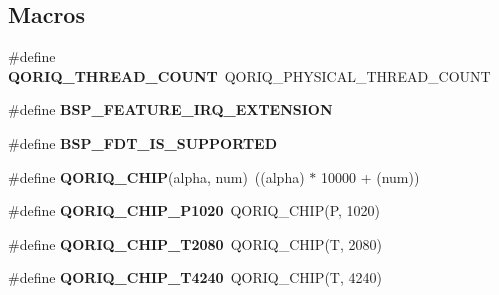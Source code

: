 \subsection*{Macros}
\begin{DoxyCompactItemize}
\item 
\mbox{\label{group__RTEMSBSPsPowerPCQorIQ_gafdba0ab6c3165e18a9eb2e47231a949f}} 
\#define {\bfseries Q\+O\+R\+I\+Q\+\_\+\+T\+H\+R\+E\+A\+D\+\_\+\+C\+O\+U\+NT}~Q\+O\+R\+I\+Q\+\_\+\+P\+H\+Y\+S\+I\+C\+A\+L\+\_\+\+T\+H\+R\+E\+A\+D\+\_\+\+C\+O\+U\+NT
\item 
\mbox{\label{group__RTEMSBSPsPowerPCQorIQ_ga5d7d631d3a14b7554160f14eb42f351b}} 
\#define {\bfseries B\+S\+P\+\_\+\+F\+E\+A\+T\+U\+R\+E\+\_\+\+I\+R\+Q\+\_\+\+E\+X\+T\+E\+N\+S\+I\+ON}
\item 
\mbox{\label{group__RTEMSBSPsPowerPCQorIQ_gaa5b7b5182d829e65400cf5cb27253ad8}} 
\#define {\bfseries B\+S\+P\+\_\+\+F\+D\+T\+\_\+\+I\+S\+\_\+\+S\+U\+P\+P\+O\+R\+T\+ED}
\item 
\mbox{\label{group__RTEMSBSPsPowerPCQorIQ_ga6e28b7050bfc7239cfee77ec3290f36a}} 
\#define {\bfseries Q\+O\+R\+I\+Q\+\_\+\+C\+H\+IP}(alpha,  num)~((alpha) $\ast$ 10000 + (num))
\item 
\mbox{\label{group__RTEMSBSPsPowerPCQorIQ_ga1478bc90448122c0cfdbcf618074e030}} 
\#define {\bfseries Q\+O\+R\+I\+Q\+\_\+\+C\+H\+I\+P\+\_\+\+P1020}~Q\+O\+R\+I\+Q\+\_\+\+C\+H\+IP(\textquotesingle{}P\textquotesingle{}, 1020)
\item 
\mbox{\label{group__RTEMSBSPsPowerPCQorIQ_ga8370a6b9546e5a9986084bcd44f361c5}} 
\#define {\bfseries Q\+O\+R\+I\+Q\+\_\+\+C\+H\+I\+P\+\_\+\+T2080}~Q\+O\+R\+I\+Q\+\_\+\+C\+H\+IP(\textquotesingle{}T\textquotesingle{}, 2080)
\item 
\mbox{\label{group__RTEMSBSPsPowerPCQorIQ_ga8072178e0376ce7de46033aea6cbfdd5}} 
\#define {\bfseries Q\+O\+R\+I\+Q\+\_\+\+C\+H\+I\+P\+\_\+\+T4240}~Q\+O\+R\+I\+Q\+\_\+\+C\+H\+IP(\textquotesingle{}T\textquotesingle{}, 4240)
\item 
\mbox{\label{group__RTEMSBSPsPowerPCQorIQ_ga4139e6657a375c51da5b308fdd6a2793}} 

\end{DoxyCompactItemize}
